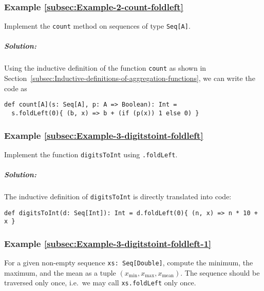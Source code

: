 \subsubsection{Example \label{subsec:Example-2-count-foldleft}\ref{subsec:Example-2-count-foldleft}}

Implement the \lstinline!count!
method on sequences of type \lstinline!Seq[A]!.

\subparagraph{Solution:}

Using the inductive definition of the function \lstinline!count!
as shown in Section~\ref{subsec:Inductive-definitions-of-aggregation-functions},
we can write the code as

\begin{lstlisting}
def count[A](s: Seq[A], p: A => Boolean): Int =
  s.foldLeft(0){ (b, x) => b + (if (p(x)) 1 else 0) }
\end{lstlisting}

\subsubsection{Example \label{subsec:Example-3-digitstoint-foldleft}\ref{subsec:Example-3-digitstoint-foldleft}}

Implement the function \lstinline!digitsToInt!
using \lstinline!.foldLeft!.

\subparagraph{Solution:}

The inductive definition of \lstinline!digitsToInt!
is directly translated into code:

\begin{lstlisting}
def digitsToInt(d: Seq[Int]): Int = d.foldLeft(0){ (n, x) => n * 10 + x }
\end{lstlisting}

\subsubsection{Example \label{subsec:Example-3-digitstoint-foldleft-1}\ref{subsec:Example-3-digitstoint-foldleft-1}}

For a given non-empty sequence \lstinline!xs: Seq[Double]!,
compute the minimum, the maximum, and the mean as a tuple $\left(x_{\min},x_{\max},x_{\text{mean}}\right)$.
The sequence should be traversed only once, i.e.~we may call \lstinline!xs.foldLeft!
only once.

